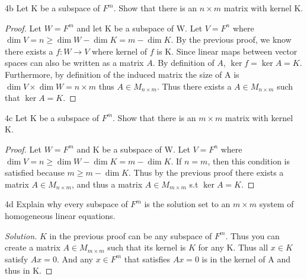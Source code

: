 \documentclass{article}
\newcommand{\rarr}[0]{\rightarrow}
\newenvironment{solution}
{\renewcommand\qedsymbol{$\blacksquare$}\begin{proof}[Solution]}
		{\end{proof}}
\begin{document}
\begin{claim}{4b}
	Let K be a subspace of $F^m$. Show that there is an $n \times m$ matrix with kernel K.
\end{claim}


\begin{proof}
	Let $W = F^m$ and let K be a subspace of W. Let $V = F^n$ where $\dim V = n \geq \dim W - \dim K = m - \dim K$. By the previous proof, we know there exists a $f: W \rarr V$ where kernel of $f$ is K. Since linear maps between vector spaces can also be written as a matrix $A$. By definition of $A$, $\ker f = \ker A = K$. Furthermore, by definition of the induced matrix the size of A is $\dim V \times \dim W = n \times m $ thus $A \in M_{n \times m}$. Thus there exists a $A \in M_{n \times m}$ such that $\ker A = K$.
\end{proof}

\begin{claim}{4c}
	Let K be a subspace of $F^m$. Show that there is an $m \times m$ matrix with kernel K.
\end{claim}
\begin{proof}
	Let $W = F^m$ and K be a subspace of W. Let $V = F^n$ where $\dim V = n \geq \dim W - \dim K = m - \dim K$. If $n = m$, then this condition is satisfied because $m \geq m - \dim K$. Thus by the previous proof there exists a matrix $A \in M_{n \times m}$, and thus a matrix $A \in M_{m \times m}$ s.t $\ker A = K$.
\end{proof}

\begin{claim}{4d}
	Explain why every subspace of $F^m$ is the solution set to an $m \times m$ system of homogeneous linear equations.
\end{claim}
\begin{solution}
	$K$ in the previous proof can be any subspace of $F^m$. Thus you can create a matrix $A \in M_{m \times m}$ such that its kernel is $K$ for any K. Thus all $x \in K$ satisfy $Ax = 0$. And any $x \in F^m$ that satisfies $Ax = 0$ is in the kernel of A and thus in K.
\end{solution}

\bigskip
\end{document}
